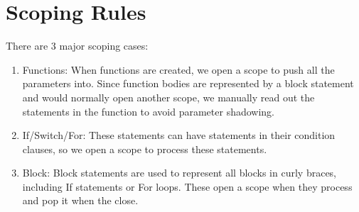 \documentclass[11pt]{article}
\begin{document}
\section {Scoping Rules}
There are 3 major scoping cases:
\begin {enumerate}
  \item Functions: When functions are created, we open a scope to push all the parameters into. Since function bodies are represented by a block statement and would normally open another scope, we manually read out the statements in the function to avoid parameter shadowing.
  \item If/Switch/For: These statements can have statements in their condition clauses, so we open a scope to process these statements.
  \item Block: Block statements are used to represent all blocks in curly braces, including If statements or For loops. These open a scope when they process and pop it when the close.
\end {enumerate}
\end{document}
